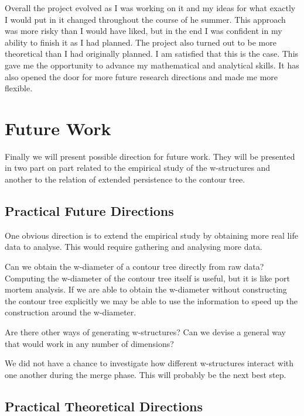 Overall the project evolved as I was working on it and my ideas for what exactly I would put in it changed throughout the course of he summer. This approach was more risky than I would have liked, but in the end I was confident in my ability to finish it as I had planned. The project also turned out to be more theoretical than I had originally planned. I am satisfied that this is the case. This gave me the opportunity to advance my mathematical and analytical skills. It has also opened the door for more future research directions and made me more flexible.



\section{Future Work}

Finally we will present possible direction for future work. They will be presented in two part on part related to the empirical study of the w-structures and another to the relation of extended persistence to the contour tree.



\subsection{Practical Future Directions}

One obvious direction is to extend the empirical study by obtaining more real life data to analyse. This would require gathering and analysing more data.

Can we obtain the w-diameter of a contour tree directly from raw data? Computing the w-diameter of the contour tree itself is useful, but it is like port mortem analysis. If we are able to obtain the w-diameter without constructing the contour tree explicitly we may be able to use the information to speed up the construction around the w-diameter.

Are there other ways of generating w-structures? Can we devise a general way that would work in any number of dimensions?

We did not have a chance to investigate how different w-structures interact with one another during the merge phase. This will probably be the next best step.

\subsection{Practical Theoretical Directions}

